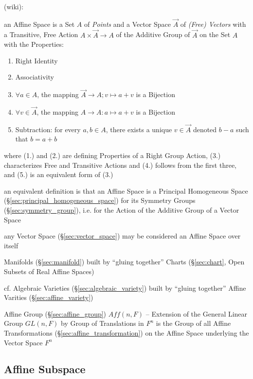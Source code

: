 (wiki):

an Affine Space is a Set $A$ of \emph{Points} and a Vector Space $\vec{A}$ of
\emph{(Free) Vectors} with a Transitive, Free Action
$A \times \vec{A} \rightarrow A$ of the Additive Group of $\vec{A}$ on the
Set $A$ with the Properties:
\begin{enumerate}
\item Right Identity
\item Associativity
\item $\forall a \in A$, the mapping $\vec{A} \rightarrow A; v \mapsto a + v$ is
  a Bijection
\item $\forall v \in \vec{A}$, the mapping $A \rightarrow A : a \mapsto a + v$
  is a Bijection
\item Subtraction: for every $a, b \in A$, there exists a unique $v \in \vec{A}$
  denoted $b - a$ such that $b = a + b$
\end{enumerate}
where (1.) and (2.) are defining Properties of a Right Group Action, (3.)
characterizes Free and Transitive Actions and (4.) follows from the first three,
and (5.) is an equivalent form of (3.)

an equivalent definition is that an Affine Space is a Principal Homogeneous
Space (\S\ref{sec:principal_homogeneous_space}) for its Symmetry Groups
(\S\ref{sec:symmetry_group}), i.e. for the Action of the Additive Group of a
Vector Space

any Vector Space (\S\ref{sec:vector_space}) may be considered an Affine Space
over itself

Manifolds (\S\ref{sec:manifold}) built by ``gluing together'' Charts
(\S\ref{sec:chart}, Open Subsets of Real Affine Spaces)

cf. Algebraic Varieties (\S\ref{sec:algebraic_variety}) built by ``gluing
together'' Affine Varities (\S\ref{sec:affine_variety})

Affine Group (\S\ref{sec:affine_group}) $Aff(n,F)$ -- Extension of the General
Linear Group $GL(n,F)$ by Group of Translations in $F^n$ is the Group of all
Affine Transformations (\S\ref{sec:affine_transformation}) on the Affine Space
underlying the Vector Space $F^n$



\subsection{Affine Subspace}\label{sec:affine_subspace}

